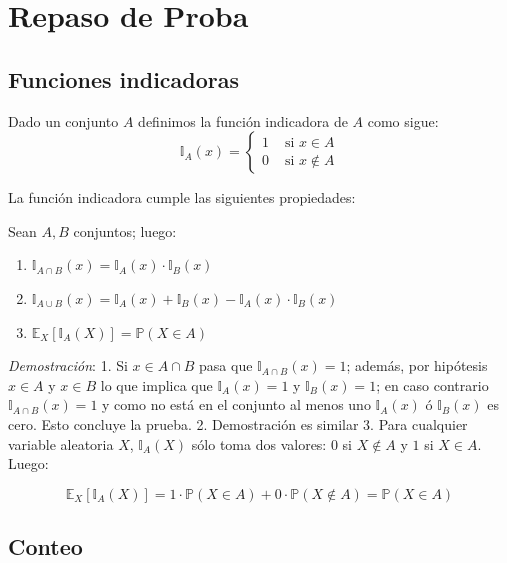 \documentclass[
]{book}
\begin{document}
\hypertarget{repaso-de-proba}{%
\chapter{Repaso de Proba}\label{repaso-de-proba}}

\hypertarget{funciones-indicadoras}{%
\section{Funciones indicadoras}\label{funciones-indicadoras}}

Dado un conjunto \(A\) definimos la función indicadora de \(A\) como sigue:
\[
\mathbb{I}_A (x)= \begin{cases}
1 & \text{ si } x \in A \\
0 & \text{ si } x \not\in A
\end{cases}
\]

La función indicadora cumple las siguientes propiedades:

Sean \(A,B\) conjuntos; luego:

\begin{enumerate}
\def\labelenumi{\arabic{enumi}.}
\item
  \(\mathbb{I}_{A \cap B}(x) = \mathbb{I}_{A}(x) \cdot \mathbb{I}_{B}(x)\)
\item
  \(\mathbb{I}_{A \cup B}(x) = \mathbb{I}_{A}(x) + \mathbb{I}_{B}(x) - \mathbb{I}_{A}(x) \cdot \mathbb{I}_{B}(x)\)
\item
  \(\mathbb{E}_X[\mathbb{I}_A(X)] = \mathbb{P}(X\in A)\)
\end{enumerate}

\emph{Demostración}:
1. Si \(x\in A \cap B\) pasa que \(\mathbb{I}_{A \cap B}(x) = 1\); además, por hipótesis \(x\in A\) y \(x \in B\) lo que implica que \(\mathbb{I}_{A}(x) = 1\) y \(\mathbb{I}_{B}(x) = 1\); en caso contrario \(\mathbb{I}_{A \cap B}(x) = 1\) y como no está en el conjunto al menos uno \(\mathbb{I}_{A}(x)\) ó \(\mathbb{I}_{B}(x)\) es cero. Esto concluye la prueba.
2. Demostración es similar
3. Para cualquier variable aleatoria \(X\), \(\mathbb{I}_{A}(X)\) sólo toma dos valores: \(0\) si \(X\not\in A\) y \(1\) si \(X\in A\). Luego:

\[
\mathbb{E}_X[\mathbb{I}_A(X)] = 1 \cdot \mathbb{P}(X\in A) + 0 \cdot \mathbb{P}(X\not\in A) = \mathbb{P}(X\in A) 
\]

\hypertarget{conteo}{%
\section{Conteo}\label{conteo}}
\end{document}
